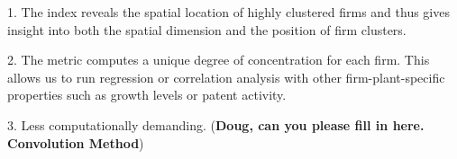 \documentclass[12pt]{article}
\begin{document}
1. The index reveals the spatial location of highly clustered firms and thus gives insight into both the spatial dimension and the position of firm clusters.

2. The metric computes a unique degree of concentration for each firm. This allows us to run regression or correlation analysis with other firm-plant-specific properties such as growth levels or patent activity.

3. Less computationally demanding. (\textbf{Doug, can you please fill in here. Convolution Method})


\end{document}
